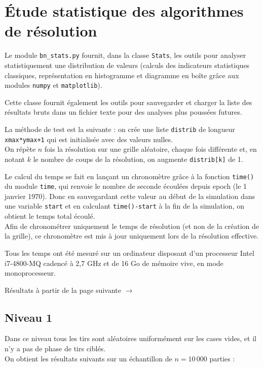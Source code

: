 \chapter{Étude statistique des algorithmes de résolution}\label{annexe_stats}
Le module \texttt{bn\_stats.py} fournit, dans la classe \texttt{Stats}, les outils pour analyser statistiquement une distribution de valeurs (calculs des indicateurs statistiques classiques, représentation en histogramme et diagramme en boîte grâce aux modules \texttt{numpy} et \texttt{matplotlib}).

Cette classe fournit également les outils pour sauvegarder et charger la liste des résultats bruts dans un fichier texte pour des analyses plus poussées futures.

La méthode de test est la suivante : on crée une liste \texttt{distrib} de longueur \texttt{xmax*ymax+1} qui est initialisée avec des valeurs nulles.\\
On répète $n$ fois la résolution sur une grille aléatoire, chaque fois différente et, en notant $k$ le nombre de coups de la résolution, on augmente \texttt{distrib[k]} de 1.

Le calcul du temps se fait en lançant un chronomètre grâce à la fonction \texttt{time()} du module \texttt{time}, qui renvoie le nombre de seconde écoulées depuis epoch (le 1 janvier 1970). Donc en sauvegardant cette valeur au début de la simulation dans une variable \texttt{start} et en calculant \texttt{time()-start} à la fin de la simulation, on obtient le temps total écoulé.\\
Afin de chronométrer uniquement le temps de résolution (et non de la création de la grille), ce chronomètre est mis à jour uniquement lors de la résolution effective.

Tous les temps ont été mesuré sur un ordinateur disposant d'un processeur Intel i7-4800-MQ cadencé à 2,7 GHz et de 16 Go de mémoire vive, en mode monoprocesseur.

\vfill 
\begin{flushright}
Résultats à partir de la page suivante $\rightarrow$
\end{flushright}
\newpage
\section{Niveau 1}
Dans ce niveau tous les tirs sont aléatoires uniformément sur les cases vides, et il n'y a pas de phase de tirs ciblés.\\
On obtient les résultats suivants sur un échantillon de $n=10\,000$ parties :

